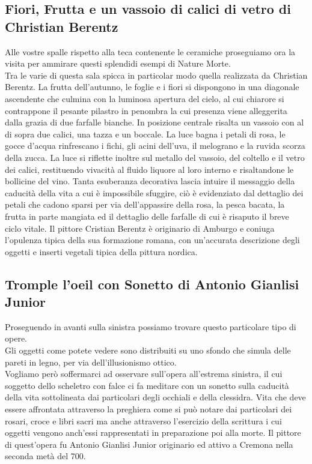 \documentclass[hidelinks,12pt,a4paper]{article}
\begin{document}
\begin{flushleft}
			\subsection{Fiori, Frutta e un vassoio di calici di vetro di Christian Berentz}
			Alle vostre spalle rispetto alla teca contenente le ceramiche proseguiamo ora la visita per ammirare questi splendidi esempi di Nature Morte.\\
			Tra le varie di questa sala spicca in particolar modo quella realizzata da Christian Berentz. La frutta dell'autunno, le foglie e i fiori si dispongono in una diagonale ascendente che culmina con la luminosa apertura del cielo, al cui chiarore si contrappone il pesante pilastro in penombra la cui presenza viene alleggerita dalla grazia di due farfalle bianche. In posizione centrale risalta un vassoio con al di sopra due calici, una tazza e un boccale. La luce bagna i petali di rosa, le gocce d'acqua rinfrescano i fichi, gli acini dell'uva, il melograno e la ruvida scorza della  zucca. La luce si riflette inoltre sul metallo del vassoio, del coltello e il vetro dei calici, restituendo vivacità al fluido liquore al loro interno e risaltandone le bollicine del vino. Tanta esuberanza decorativa lascia intuire il messaggio della caducità della vita a cui è impossibile sfuggire, ciò è evidenziato dal dettaglio dei petali che cadono sparsi per via dell'appassire della rosa, la pesca bacata, la frutta in parte mangiata ed il dettaglio delle farfalle di cui è risaputo il breve ciclo vitale. Il pittore Cristian Berentz è originario di Amburgo e coniuga l'opulenza tipica della sua formazione romana, con un'accurata descrizione degli oggetti e inserti vegetali tipica della pittura nordica.
	
			\subsection{Tromple l'oeil con Sonetto di Antonio Gianlisi Junior}
			Proseguendo in avanti sulla sinistra possiamo trovare questo particolare tipo di opere.\\
			Gli oggetti come potete vedere sono distribuiti su uno sfondo che simula delle pareti in legno, per via dell'illusionismo ottico.\\
			Vogliamo però soffermarci ad osservare sull'opera all'estrema sinistra, il cui soggetto dello scheletro con falce ci fa meditare con un sonetto sulla caducità della vita sottolineata dai particolari degli occhiali e della clessidra. Vita che deve essere affrontata attraverso la preghiera come si può notare dai particolari dei rosari, croce e libri sacri ma anche attraverso l'esercizio della scrittura i cui oggetti vengono anch'essi rappresentati in preparazione poi alla morte. Il pittore di quest'opera fu Antonio Gianlisi Junior originario ed attivo a Cremona nella seconda metà del 700.
	

\end{flushleft}
\end{document}
